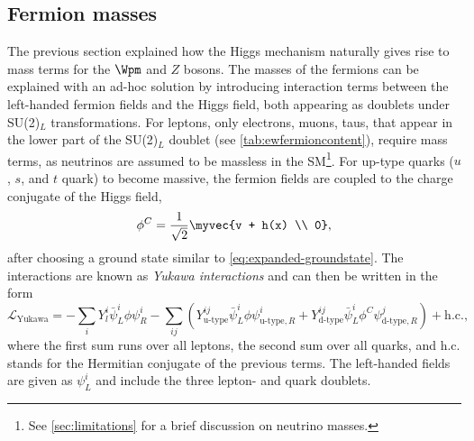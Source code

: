 \subsection{Fermion masses}
\label{subsec:fermion-masses}
The previous section explained how the Higgs mechanism naturally gives rise to mass terms for the $\Wpm$ and $Z$ bosons.
The masses of the fermions can be explained with an ad-hoc solution by introducing interaction terms between the left-handed fermion fields and the Higgs field, both appearing as doublets under SU(2)$_L$ transformations.
For leptons, only electrons, muons, taus, that appear in the lower part of the SU(2)$_L$ doublet (see \cref{tab:ewfermioncontent}), require mass terms, as neutrinos are assumed to be massless in the SM\footnote{See \cref{sec:limitations} for a brief discussion on neutrino masses.}.
For up-type quarks ($u$, $s$, and $t$ quark) to become massive, the fermion fields are coupled to the charge conjugate of the Higgs field,
\begin{equation}
  \phi^C = \frac{1}{\sqrt{2}} \myvec{v + h(x) \\ 0},
\end{equation}
after choosing a ground state similar to \cref{eq:expanded-groundstate}.
The interactions are known as \emph{Yukawa interactions} and can then be written in the form
\begin{equation}
  \mathcal{L}_\text{Yukawa} = - \sum_{i} Y_l^i \bar{\psi}^{i}_{L} \phi \psi^{i}_{R} - \sum_{ij} \left( Y_{\text{u-type}}^{ij} \bar{\psi}^{i}_{L} \phi \psi^{i}_{\text{u-type},R} + Y_{\text{d-type}}^{ij} \bar{\psi}^{i}_{L} \phi^C \psi^{j}_{\text{d-type}, R} \right) + \text{h.c.},
  \label{eq:lyukawa}
\end{equation}
where the first sum runs over all leptons, the second sum over all quarks, and h.c. stands for the Hermitian conjugate of the previous terms.
The left-handed fields are given as $\psi^{i}_{L}$ and include the three lepton- and quark doublets.
